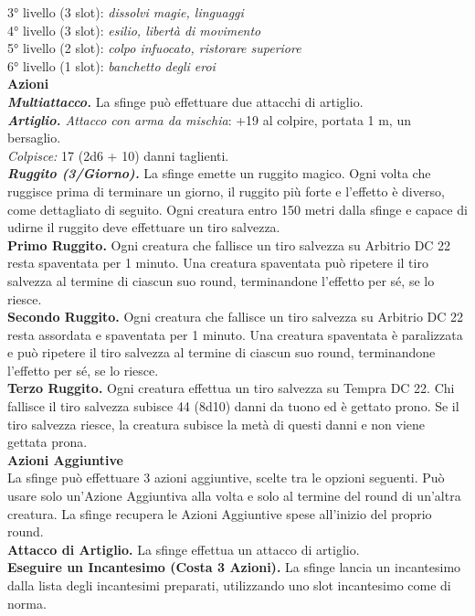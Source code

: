 \begin{multicols}{2}
3° livello (3 slot): \emph{dissolvi magie, linguaggi}\\
4° livello (3 slot): \emph{esilio, libertà di movimento}\\
5° livello (2 slot): \emph{colpo infuocato, ristorare superiore}\\
6° livello (1 slot): \emph{banchetto degli eroi}\\
\smallskip\textbf{Azioni}\\
\emph{\textbf{Multiattacco.}} La sfinge può effettuare due attacchi di artiglio.\\
\emph{\textbf{Artiglio.} Attacco con arma da mischia}: +19 al colpire, portata 1 m, un bersaglio.\\
\emph{Colpisce:} 17 (2d6 + 10) danni taglienti.\\
\emph{\textbf{Ruggito (3/Giorno).}} La sfinge emette un ruggito magico. Ogni volta che ruggisce prima di terminare un giorno, il ruggito più forte e l'effetto è diverso, come dettagliato di seguito. Ogni creatura entro 150 metri dalla sfinge e capace di udirne il ruggito deve effettuare un tiro salvezza.\\
\textbf{Primo Ruggito.} Ogni creatura che fallisce un tiro salvezza su Arbitrio DC  22 resta spaventata per 1 minuto. Una creatura spaventata può ripetere il tiro salvezza al termine di ciascun suo round, terminandone l'effetto per sé, se lo riesce.\\
\textbf{Secondo Ruggito.} Ogni creatura che fallisce un tiro salvezza su Arbitrio DC  22 resta assordata e spaventata per 1 minuto. Una creatura spaventata è paralizzata e può ripetere il tiro salvezza al termine di ciascun suo round, terminandone l'effetto per sé, se lo riesce.\\
\textbf{Terzo Ruggito.} Ogni creatura effettua un tiro salvezza su Tempra DC  22. Chi fallisce il tiro salvezza subisce 44 (8d10) danni da tuono ed è gettato prono. Se il tiro salvezza riesce, la
creatura subisce la metà di questi danni e non viene gettata prona.\\
\textbf{Azioni Aggiuntive}\\
La sfinge può effettuare 3 azioni aggiuntive, scelte tra le opzioni seguenti. Può usare solo un'Azione Aggiuntiva alla volta e solo al termine del round di un'altra creatura. La sfinge recupera le Azioni Aggiuntive spese all'inizio del proprio round.\\
\textbf{Attacco di Artiglio.} La sfinge effettua un attacco di artiglio. \\
\textbf{Eseguire un Incantesimo (Costa 3 Azioni).} La sfinge lancia un incantesimo dalla lista degli incantesimi preparati, utilizzando uno slot incantesimo come di norma.\\

\end{multicols}
